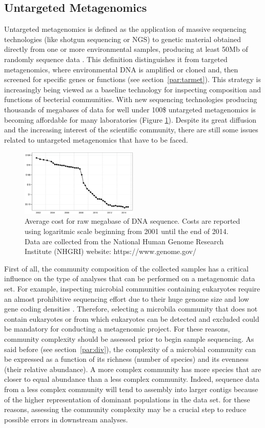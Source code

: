 \subsection{Untargeted Metagenomics}
Untargeted metagenomics is defined as the application of massive sequencing technologies (like shotgun sequencing or NGS) to genetic material obtained directly from one or more environmental samples, producing at least 50Mb of randomly sequence data \cite{kunin2008bioinformatician}. This definition distinguishes it from targeted metagenomics, where environmental DNA is amplified or cloned and, then screened for specific genes or functions (see section~\ref{par:tarmet}). This strategy is increasingly being viewed as a baseline technology for inspecting composition and functions of becterial communities. With new sequencing technologies producing thousands of megabases of data for well under 100\$ untargeted metagenomics is becoming affordable for many laboratories (Figure \ref{fig:seqcost}). Despite its great diffusion and the increasing interest of the scientific community, there are still some issues related to untargeted metagenomics that have to be faced.\\
\begin{figure}[!tb]
	\centering
	\includegraphics[width=0.5\textwidth]{./figures/Introduction/seq_cost}
  	\caption{Average cost for raw megabase of DNA sequence. Costs are reported using logaritmic scale beginning from 2001 until the end of 2014. Data are collected from the National Human Genome Research Institute (NHGRI) website: https://www.genome.gov/ \label{fig:seqcost}}
\end{figure}
First of all, the community composition of the collected samples has a critical influence on the type of analyses that can be performed on a metagenomic data set. For example, inspecting microbial communities containing eukaryotes require an almost prohibitive sequencing effort due to their huge genome size and low gene coding densities \cite{thomas1971genetic}. Therefore, selecting a microbila community that does not contain eukaryotes or from which eukaryotes can be detected and excluded could be mandatory for conducting a metagenomic project. For these reasons, community complexity should be assessed prior to begin sample sequencing. As said before (see section~\ref{par:div}), the complexity of a microbial community can be expressed as a function of its richness (number of species) and its evenness (their relative abundance). A more complex community has more species that are closer to equal abundance than a less complex community. Indeed, sequence data from a less complex community will tend to assembly into larger contigs because of the higher representation of dominant populations in the data set. for these reasons, assessing the community complexity may be a crucial step to reduce possible errors in downstream analyses.\\
